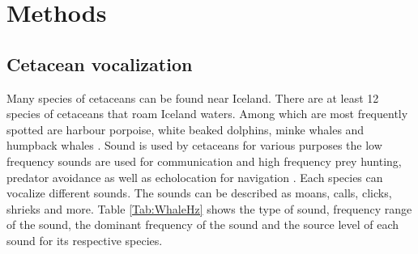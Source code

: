 \chapter{Methods}

\section{Cetacean vocalization}

Many species of cetaceans can be found near Iceland.
There are at least 12 species of cetaceans that roam Iceland waters.
Among which are most frequently spotted are harbour porpoise, white beaked dolphins, minke whales and humpback whales \cite{user_whales_nodate}.
Sound is used by cetaceans for various purposes the low frequency sounds are used for communication and high frequency prey hunting, predator avoidance as well as echolocation for navigation \cite{nowacek_studying_2016}.
Each species can vocalize different sounds.
The sounds can be described as moans, calls, clicks, shrieks and more\cite{greenhow_hearing_nodate}.
Table \ref{Tab:WhaleHz} shows the type of sound, frequency range of the sound, the dominant frequency of the sound and the source level of each sound for its respective species.

\newpage


